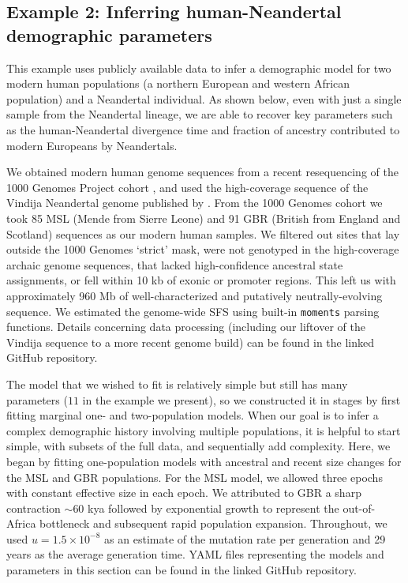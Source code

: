 \documentclass[]{article}
\newcommand{\moments}{\texttt{moments}\xspace}
\begin{document}
\subsection*{Example 2: Inferring human-Neandertal demographic parameters}

This example uses publicly available data to infer a demographic model for two
modern human populations (a northern European and western African population) 
and a Neandertal individual. As shown below, even with just a single sample 
from the Neandertal lineage, we are able to recover key parameters such as the
human-Neandertal divergence time and fraction of ancestry contributed to modern 
Europeans by Neandertals.

We obtained modern human genome sequences from a recent resequencing of the 
1000 Genomes Project cohort \cite{byrska2022high}, and used the high-coverage 
sequence of the Vindija Neandertal genome published by \cite{prufer2017high}. 
From the 1000 Genomes cohort we took 85 MSL (Mende from Sierre Leone) and 91 
GBR (British from England and Scotland) sequences as our modern human samples.  
We filtered out sites that lay outside the 1000 Genomes `strict' mask, 
were not genotyped in the high-coverage archaic genome sequences, 
that lacked high-confidence ancestral state assignments, or fell within 10 kb of 
exonic or promoter regions. This left us with approximately 960 Mb of 
well-characterized and putatively neutrally-evolving sequence.
We estimated the genome-wide SFS using built-in \moments parsing functions.
Details concerning data processing (including our liftover of the Vindija 
sequence to a more recent genome build) can be found in the linked GitHub 
repository.

The model that we wished to fit is relatively simple but still has many
parameters ($11$ in the example we present), so we constructed it in stages by
first fitting marginal one- and two-population models. When our goal is to infer 
a complex demographic history involving multiple populations, it is helpful to 
start simple, with subsets of the full data, and sequentially add complexity.  
Here, we began by fitting one-population models with ancestral and recent size 
changes for the MSL and GBR populations.  For the MSL model, we allowed three 
epochs with constant effective size in each epoch. We attributed to GBR a sharp 
contraction $\sim$60 kya followed by exponential growth to represent the 
out-of-Africa bottleneck and subsequent rapid population expansion.  Throughout, 
we used $u=1.5\times 10^{-8}$ as an estimate of the mutation rate per generation 
and 29 years as the average generation time. YAML files representing the models 
and parameters in this section can be found in the linked GitHub repository.
\end{document}
